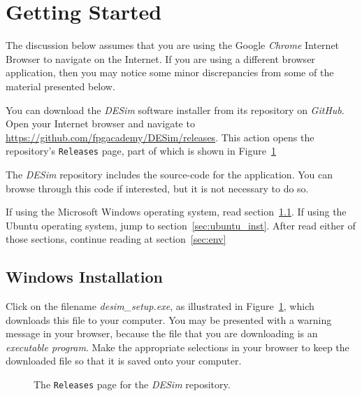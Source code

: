 \documentclass[11pt, twoside, pdftex]{article}
\begin{document}
\section{Getting Started}

The discussion below assumes that you are using the Google {\it Chrome} Internet Browser to
navigate on the Internet.  If you are using a different browser application, then you may
notice some minor discrepancies from some of the material presented below. 

You can download the {\it DESim} software installer from its repository on {\it GitHub}. 
Open your Internet browser and navigate to \url{https://github.com/fpgacademy/DESim/releases}.
This action opens the repository's \texttt{Releases} page, part of which is shown in 
Figure~\ref{fig:release}

The {\it DESim} repository includes the source-code 
for the application. You can browse through this code if interested, but it is not necessary to
do so.

If using the Microsoft Windows operating system, read section~\ref{sec:win_inst}. If using the
Ubuntu operating system, jump to section~\ref{sec:ubuntu_inst}. After read either of those sections,
continue reading at section~\ref{sec:env}

\subsection{Windows Installation} \label{sec:win_inst}

Click on the filename {\it desim\_setup.exe}, as illustrated in Figure~\ref{fig:release},
which downloads this file to your computer. You may be presented with a
warning message in your browser, because the file that you are downloading is an 
{\it executable program}. Make the appropriate selections in your browser to keep the downloaded
file so that it is saved onto your computer.

\begin{figure}[h]
	\begin{center}
        \setlength{\fboxsep}{0pt}
	\end{center}
          \caption{The \texttt{Releases} page for the {\it DESim} repository.}
	\label{fig:release}
\end{figure}
\end{document}
